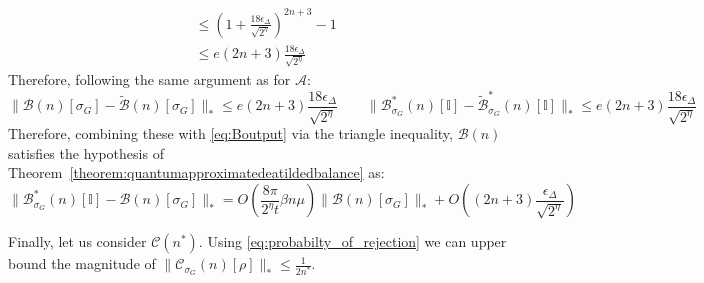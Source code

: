 \documentclass[aps,floatfix,10pt,amssymb,amsfont,amsmath,superscriptaddress,float,nofootinbib,longbibliography,nobalancelastpage,twocolumn]{revtex4-2}
\begin{document}
\begin{widetext}
\begin{align}
    &\leq  (1+\frac{18\epsilon_{\Delta}}{\sqrt{2^{\eta}}})^{2n+3}-1\\
     &\leq e(2n+3)\frac{18\epsilon_{\Delta}}{\sqrt{2^{\eta}}}
\end{align}
Therefore, following the same argument as for $\mathcal{A}$:
\begin{equation}
    \|\mathcal{B}(n)[\sigma_G] - \tilde{\mathcal{B}}(n)[\sigma_G]\|_* \leq e(2n+3)\frac{18\epsilon_{\Delta}}{\sqrt{2^{\eta}}} \qquad \|\mathcal{B}^*_{\sigma_G}(n)[\mathbb{I}] - \tilde{\mathcal{B}}^*_{\sigma_G}(n)[\mathbb{I}]\|_* \leq e(2n+3)\frac{18\epsilon_{\Delta}}{\sqrt{2^{\eta}}}
\end{equation}
Therefore, combining these with \eqref{eq:Boutput} via the triangle inequality, $\mathcal{B}(n)$ satisfies the hypothesis of Theorem~\ref{theorem:quantumapproximatedeatildedbalance} as:
\begin{equation}
    \|\mathcal{B}^*_{\sigma_G}(n)[\mathbb{I}] - \mathcal{B}(n)[\sigma_G]\|_* = O\left(\frac{8\pi}{2^{\eta}t}\beta n\mu\right)\|\mathcal{B}(n)[\sigma_G]\|_* +O\left((2n+3)\frac{\epsilon_{\Delta}}{\sqrt{2^{\eta}}}\right) 
\end{equation}

Finally, let us consider $\mathcal{C}(n^*)$. Using \eqref{eq:probabilty_of_rejection} we can upper bound the magnitude of $\|\mathcal{C}_{\sigma_G}(n)[\rho]\|_{*}\leq\frac{1}{2n^*}$.



\end{widetext}
\end{document}
